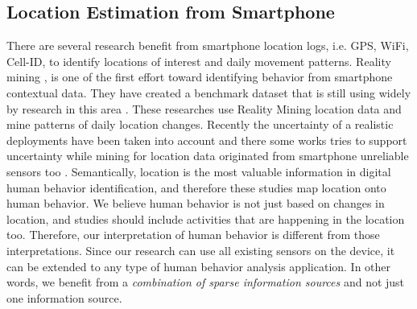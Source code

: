 \documentclass{sig-alternate}
\begin{document}
\subsection{Location Estimation from Smartphone}
There are several research benefit from smartphone location logs, i.e. GPS, WiFi, Cell-ID, to identify locations of interest and daily movement patterns. Reality mining \cite{eigenbehav}, is one of the first effort toward identifying behavior from smartphone contextual data. They have created a benchmark dataset that is still using widely by research in this area \cite{probappmin, unsupframe, autrec}. These researches use Reality Mining location data and mine patterns of daily location changes. Recently the uncertainty of a realistic deployments have been taken into account and there some works tries to support uncertainty while mining for location data originated from smartphone unreliable sensors too \cite{autrec}.  Semantically, location is the most valuable information in digital human behavior identification, and therefore these studies map location onto human behavior. We believe human behavior is not just based on changes in location, and studies should include activities that are happening in the location too. Therefore, our interpretation of human behavior is different from those interpretations. Since our research can use all existing sensors on the device, it can be extended to any type of human behavior analysis application. In other words, we benefit from a \emph{combination of sparse information sources} and not just one information source.
\vspace{-0.2cm}
\end{document}
